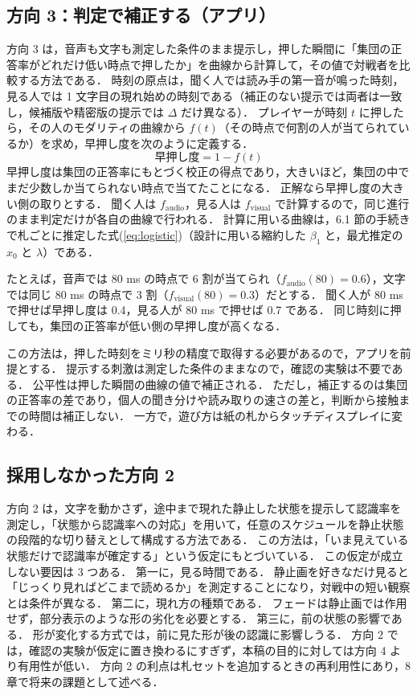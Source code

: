 \subsection{方向 3：判定で補正する（アプリ）}

方向 3 は，音声も文字も測定した条件のまま提示し，押した瞬間に「集団の正答率がどれだけ低い時点で押したか」を曲線から計算して，その値で対戦者を比較する方法である．
時刻の原点は，聞く人では読み手の第一音が鳴った時刻，見る人では 1 文字目の現れ始めの時刻である（補正のない提示では両者は一致し，候補版や精密版の提示では $\Delta$ だけ異なる）．
プレイヤーが時刻 $t$ に押したら，その人のモダリティの曲線から $f(t)$（その時点で何割の人が当てられているか）を求め，早押し度を次のように定義する．
\begin{equation}
\text{早押し度} = 1 - f(t)
\label{eq:earliness}
\end{equation}
早押し度は集団の正答率にもとづく校正の得点であり，大きいほど，集団の中でまだ少数しか当てられない時点で当てたことになる．
正解なら早押し度の大きい側の取りとする．
聞く人は $f_{\mathrm{audio}}$，見る人は $f_{\mathrm{visual}}$ で計算するので，同じ進行のまま判定だけが各自の曲線で行われる．
計算に用いる曲線は，6.1 節の手続きで札ごとに推定した式(\ref{eq:logistic})（設計に用いる縮約した $\beta_1$ と，最尤推定の $x_0$ と $\lambda$）である．

たとえば，音声では 80 ms の時点で 6 割が当てられ（$f_{\mathrm{audio}}(80) = 0.6$），文字では同じ 80 ms の時点で 3 割（$f_{\mathrm{visual}}(80) = 0.3$）だとする．
聞く人が 80 ms で押せば早押し度は 0.4，見る人が 80 ms で押せば 0.7 である．
同じ時刻に押しても，集団の正答率が低い側の早押し度が高くなる．

この方法は，押した時刻をミリ秒の精度で取得する必要があるので，アプリを前提とする．
提示する刺激は測定した条件のままなので，確認の実験は不要である．
公平性は押した瞬間の曲線の値で補正される．
ただし，補正するのは集団の正答率の差であり，個人の聞き分けや読み取りの速さの差と，判断から接触までの時間は補正しない．
一方で，遊び方は紙の札からタッチディスプレイに変わる．

\subsection{採用しなかった方向 2}

方向 2 は，文字を動かさず，途中まで現れた静止した状態を提示して認識率を測定し，「状態から認識率への対応」を用いて，任意のスケジュールを静止状態の段階的な切り替えとして構成する方法である．
この方法は，「いま見えている状態だけで認識率が確定する」という仮定にもとづいている．
この仮定が成立しない要因は 3 つある．
第一に，見る時間である．
静止画を好きなだけ見ると「じっくり見ればどこまで読めるか」を測定することになり，対戦中の短い観察とは条件が異なる．
第二に，現れ方の種類である．
フェードは静止画では作用せず，部分表示のような形の劣化を必要とする．
第三に，前の状態の影響である．
形が変化する方式では，前に見た形が後の認識に影響しうる．
方向 2 では，確認の実験が仮定に置き換わるにすぎず，本稿の目的に対しては方向 4 より有用性が低い．
方向 2 の利点は札セットを追加するときの再利用性にあり，8 章で将来の課題として述べる．


